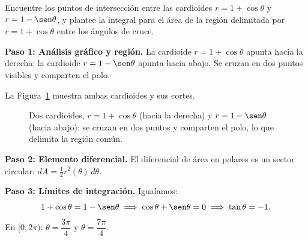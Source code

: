 \begin{example}
Encuentre los puntos de intersección entre las cardioides
$r = 1 + \cos\theta$ y $r = 1 - \sen\theta$, y plantee la integral para el
área de la región delimitada por $r = 1 + \cos\theta$ entre los ángulos de
cruce.

\begin{myproof}

\textbf{Paso 1: Análisis gráfico y región.}
La cardioide $r = 1 + \cos\theta$ apunta hacia la derecha; la cardioide
$r = 1 - \sen\theta$ apunta hacia abajo. Se cruzan en dos puntos visibles
y comparten el polo.

La Figura~\ref{fig:dos_cardioides_area} muestra ambas cardioides y sus cortes.

\begin{figure}[H]
\centering
{}
\caption{Dos cardioides, $r=1+\cos\theta$ (hacia la derecha) y $r=1-\sen\theta$ (hacia abajo): se cruzan en dos puntos y comparten el polo, lo que delimita la región común.}
\label{fig:dos_cardioides_area}
\end{figure}

\textbf{Paso 2: Elemento diferencial.}
El diferencial de área en polares es un sector circular:
$dA = \tfrac{1}{2}r^2(\theta)\,d\theta$.

\textbf{Paso 3: Límites de integración.}
Igualamos:
\[
  1 + \cos\theta = 1 - \sen\theta
  \implies \cos\theta + \sen\theta = 0
  \implies \tan\theta = -1.
\]
En $[0, 2\pi)$: $\theta = \dfrac{3\pi}{4}$ y $\theta = \dfrac{7\pi}{4}$.


\end{myproof}
\end{example}
